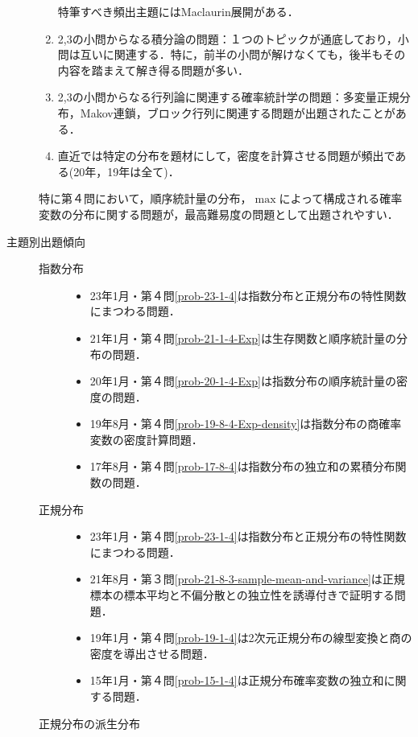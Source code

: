 \documentclass[uplatex,dvipdfmx]{jsarticle}
\begin{document}
\begin{description}
\begin{enumerate}[{第}1{問}]
        特筆すべき頻出主題にはMaclaurin展開がある．
        \item 2,3の小問からなる積分論の問題：１つのトピックが通底しており，小問は互いに関連する．特に，前半の小問が解けなくても，後半もその内容を踏まえて解き得る問題が多い．
        \item 2,3の小問からなる行列論に関連する確率統計学の問題：多変量正規分布，Makov連鎖，ブロック行列に関連する問題が出題されたことがある．
        \item 直近では特定の分布を題材にして，密度を計算させる問題が頻出である(20年，19年は全て)．
    \end{enumerate}
    特に第４問において，順序統計量の分布，$\max$によって構成される確率変数の分布に関する問題が，最高難易度の問題として出題されやすい．
    \item[主題別出題傾向]\mbox{}
    \begin{description}
        \item[指数分布] \mbox{}
        \begin{itemize}
            \item 23年1月・第４問\ref{prob-23-1-4}は指数分布と正規分布の特性関数にまつわる問題．
            \item 21年1月・第４問\ref{prob-21-1-4-Exp}は生存関数と順序統計量の分布の問題．
            \item 20年1月・第４問\ref{prob-20-1-4-Exp}は指数分布の順序統計量の密度の問題．
            \item 19年8月・第４問\ref{prob-19-8-4-Exp-density}は指数分布の商確率変数の密度計算問題．
            \item 17年8月・第４問\ref{prob-17-8-4}は指数分布の独立和の累積分布関数の問題．
        \end{itemize}
        \item[正規分布] \mbox{}
        \begin{itemize}
            \item 23年1月・第４問\ref{prob-23-1-4}は指数分布と正規分布の特性関数にまつわる問題．
            \item 21年8月・第３問\ref{prob-21-8-3-sample-mean-and-variance}は正規標本の標本平均と不偏分散との独立性を誘導付きで証明する問題．
            \item 19年1月・第４問\ref{prob-19-1-4}は2次元正規分布の線型変換と商の密度を導出させる問題．
            \item 15年1月・第４問\ref{prob-15-1-4}は正規分布確率変数の独立和に関する問題．
        \end{itemize}
        \item[正規分布の派生分布] 

\end{description}
\end{description}
\end{document}
